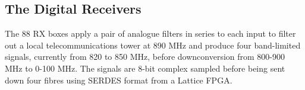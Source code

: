 \subsection{The Digital Receivers}
The 88 RX boxes apply a pair of analogue filters in series to each input to filter out a local telecommunications tower at 890 MHz and produce four band-limited signals, currently from 820 to 850 MHz, before downconversion from 800-900 MHz to 0-100 MHz. The signals are 8-bit complex sampled before being sent down four fibres using SERDES format from a Lattice FPGA.

  
  